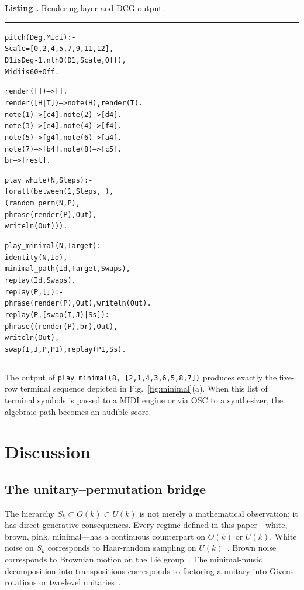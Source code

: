 \documentclass[
  twocolumn,
  aps,
  pra,
  showkeys,
  amsmath,amssymb,
  longbibliography
]{revtex4-2}
\newcounter{listing}
\renewcommand{\thelisting}{\arabic{listing}}
\newcommand{\listingtitle}[2]{%
  \refstepcounter{listing}%
  \par\smallskip
  \noindent\textbf{Listing \thelisting.} #2%
  \label{#1}%
  \par\smallskip
}
\newenvironment{codeblock}
  {\par\smallskip\noindent\hrule\smallskip
   \begingroup\footnotesize\ttfamily\begin{alltt}}
  {\end{alltt}\endgroup\smallskip\hrule\smallskip}
\begin{document}
\listingtitle{lst:render}{Rendering layer and DCG output.}
\begin{codeblock}
pitch(Deg, Midi) :-
    Scale=[0,2,4,5,7,9,11,12],
    D1 is Deg-1, nth0(D1,Scale,Off),
    Midi is 60 + Off.

render([]) --> [].
render([H|T]) --> note(H), render(T).
note(1)-->[c4].  note(2)-->[d4].
note(3)-->[e4].  note(4)-->[f4].
note(5)-->[g4].  note(6)-->[a4].
note(7)-->[b4].  note(8)-->[c5].
br --> [rest].

play_white(N, Steps) :-
    forall(between(1,Steps,_),
      (random_perm(N,P),
       phrase(render(P),Out),
       writeln(Out))).

play_minimal(N, Target) :-
    identity(N, Id),
    minimal_path(Id, Target, Swaps),
    replay(Id, Swaps).
replay(P, []) :-
    phrase(render(P),Out), writeln(Out).
replay(P, [swap(I,J)|Ss]) :-
    phrase((render(P),br),Out),
    writeln(Out),
    swap(I,J,P,P1), replay(P1,Ss).
\end{codeblock}

The output of \texttt{play\_minimal(8, [2,1,4,3,6,5,8,7])}
produces exactly the five-row terminal sequence depicted in
Fig.~\ref{fig:minimal}(a).
When this list of terminal symbols is passed to a MIDI engine
or via OSC to a synthesizer, the algebraic path becomes an
audible score.

\section{Discussion}
\label{sec:discussion}

\subsection{The unitary--permutation bridge}

The hierarchy $S_k\subset O(k)\subset U(k)$ is not merely a
mathematical observation; it has direct generative
consequences.
Every regime defined in this paper---white, brown, pink,
minimal---has a continuous counterpart on $O(k)$ or $U(k)$.
White noise on $S_k$ corresponds to Haar-random sampling on
$U(k)$~\cite{mezzadri-07}.
Brown noise corresponds to Brownian motion on the Lie
group~\cite{liao-04}.
The minimal-music decomposition into transpositions
corresponds to factoring a unitary into Givens rotations or
two-level unitaries~\cite{nielsen-chuang-00,golub-vanloan-13}.
\end{document}
